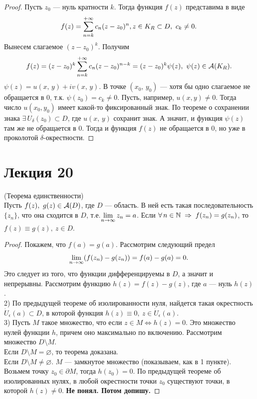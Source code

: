 	\begin{proof}
		Пусть $z_0$ --- нуль кратности $k$. Тогда функция $f(z)$ представима в виде
		\[ f(z) = \sum\limits_{n=k}^{+\infty}c_n(z-z_0)^n,
		 z\in K_R\subset D,\ c_k\ne 0. \]
		Вынесем слагаемое $(z-z_0)^k$. Получим
		\[ f(z) = (z-z_0)^k\Sum_{n=k}^{+\infty}c_n(z-z_0)^{n-k} = (z-z_0)^k\psi(z),\ \psi(z)\in\A(K_R). \]
		$\psi(z) = u(x,\,y) + iv(x,\,y)$. В точке $(x_0,\,y_0)$ --- хотя бы одно слагаемое не обращается в $0$, т.к. $\psi(z_0) = c_k\ne 0$. Пусть, например, $u(x,y)\ne 0$. Тогда число $u(x_0,y_0)$ имеет какой-то фиксированный знак. По теореме о сохранении знака $\exists\, U_\delta(z_0)\subset D$, где $u(x,\,y)$ сохранит знак. А значит, и функция $\psi(z)$ там же не обращается в 0. Тогда и функция $f(z)$ не обращается в $0$, но уже в проколотой $\delta$-окрестности.
	\end{proof}
	\newpage
	\section{Лекция 20}
	\begin{theorem*}
		(Теорема единственности)\\
		\indent Пусть $f(z),\ g(z)\in\mathcal{A}(D)$, где $D$ --- область. В ней есть такая последовательность $\{z_n\}$, что она сходится в $D$, т.е.$\lim\limits_{n\to\infty} z_n = a$. Если $\forall\,n\in\mathbb{N} \;\Rightarrow\; f(z_n) = g(z_n)$, то\mbox{ $f(z)\equiv g(z),\ z\in D$.} %
	\end{theorem*}
	\begin{proof}
		Покажем, что $f(a) = g(a)$. Рассмотрим следующий предел
		\[ \lim\limits_{n\to\infty} (f(z_n) - g(z_n)) = f(a) - g(a) = 0.\]
		Это следует из того, что функции дифференцируемы в $D$, а значит и непрерывны.
		Рассмотрим функцию $h(z) = f(z) - g(z)$, где $a$ --- нуль $h(z)$.\\
		2) По предыдущей теореме об изолированности нуля, найдется такая окрестность $\dot U_{\epsilon}(a)\subset D$, в которой функция $h(z) \equiv 0,\ z\in\dot U_{\epsilon}(a)$.\\
		3) Пусть $M$ такое множество, что если $z\in M \iff h(z) = 0$. Это множество нулей функции $h$, причем оно максимально по включению. Рассмотрим множество $D\setminus M$.\\
		Если $D \setminus M = \varnothing$, то теорема доказана.\\
		Если $D \setminus M\ne\varnothing$. $M$ --- замкнутое множество (показываем, как в 1 пункте). Возьмем точку $z_0\in\partial M$, тогда $h(z_0) = 0$. По предыдущей теореме об изолированных нулях, в любой окрестности точки $z_0$ существуют точки, в которой $h(z) \ne 0$. \textbf{Не понял. Потом допишу.}
	\end{proof}
